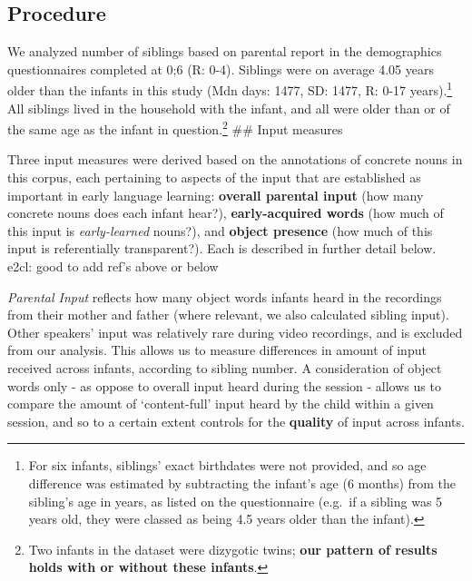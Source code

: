 \documentclass[
  english,
  man,floatsintext]{apa6}
\begin{document}
\hypertarget{procedure}{%
\subsection{Procedure}\label{procedure}}

We analyzed number of siblings based on parental report in the demographics questionnaires completed at 0;6 (R: 0-4). Siblings were on average 4.05 years older than the infants in this study (Mdn days: 1477, SD: 1477, R: 0-17 years).\footnote{For six infants, siblings' exact birthdates were not provided, and so age difference was estimated by subtracting the infant's age (6 months) from the sibling's age in years, as listed on the questionnaire (e.g.~if a sibling was 5 years old, they were classed as being 4.5 years older than the infant).} All siblings lived in the household with the infant, and all were older than or of the same age as the infant in question.\footnote{Two infants in the dataset were dizygotic twins; \textbf{our pattern of results holds with or without these infants}.}
\#\# Input measures

Three input measures were derived based on the annotations of concrete nouns in this corpus, each pertaining to aspects of the input that are established as important in early language learning: \textbf{overall parental input} (how many concrete nouns does each infant hear?), \textbf{early-acquired words} (how much of this input is \emph{early-learned} nouns?), and \textbf{object presence} (how much of this input is referentially transparent?). Each is described in further detail below.
e2cl: good to add ref's above or below

\emph{Parental Input} reflects how many object words infants heard in the recordings from their mother and father (where relevant, we also calculated sibling input). Other speakers' input was relatively rare during video recordings, and is excluded from our analysis. This allows us to measure differences in amount of input received across infants, according to sibling number. A consideration of object words only - as oppose to overall input heard during the session - allows us to compare the amount of `content-full' input heard by the child within a given session, and so to a certain extent controls for the \textbf{quality} of input across infants.
\end{document}
